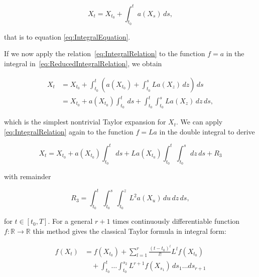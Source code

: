\begin{equation}\label{eq:ReducedIntegralRelation}
    X_t = X_{t_0} + \int_{t_0}^t a(X_s) \, ds,
\end{equation}

\noindent that is to equation \eqref{eq:IntegralEquation}.

If we now apply the relation~\eqref{eq:IntegralRelation} to the function \(f = a\) in the integral in~\eqref{eq:ReducedIntegralRelation}, we obtain

\begin{equation}\label{eq:FirstTaylorExpansion}
    \begin{split}
        X_t &= X_{t_0} + \int_{t_0}^t \left( a(X_{t_0}) + \int_{t_0}^s La(X_z) \, dz \right) \, ds \\
        &= X_{t_0} + a(X_{t_0}) \int_{t_0}^t \, ds + \int_{t_0}^t \int_{t_0}^s La(X_z) \, dz \, ds,
    \end{split}
\end{equation}

\noindent which is the simplest nontrivial Taylor expansion for \(X_t\). We can apply \eqref{eq:IntegralRelation} again to the function \(f = La\) in the double integral to derive

\begin{equation}\label{eq:SecondTaylorExpansion}
    X_t = X_{t_0} + a(X_{t_0}) \int_{t_0}^t \, ds + La(X_{t_0}) \int_{t_0}^t \int_{t_0}^s \, dz \, ds + R_3
\end{equation}

\noindent with remainder

\begin{equation}\label{eq:RemainderTerm}
    R_3 = \int_{t_0}^t \int_{t_0}^s \int_{t_0}^z L^2 a(X_u) \, du \, dz \, ds,
\end{equation}

\noindent for \(t \in [t_0, T]\). For a general \(r+1\) times continuously differentiable function \(f : \mathbb{R} \to \mathbb{R}\) this method gives the classical Taylor formula in integral form:

\begin{equation}\label{eq:GeneralTaylorFormula}
    \begin{split}
        f(X_t) &= f(X_{t_0}) + \sum_{l=1}^r \frac{(t-t_0)^l}{l!} L^l f(X_{t_0}) \\
        &\quad + \int_{t_0}^t \dots \int_{t_0}^{s_2} L^{r+1} f(X_{s_1}) \, ds_1 \dots ds_{r+1}
    \end{split}
\end{equation}

